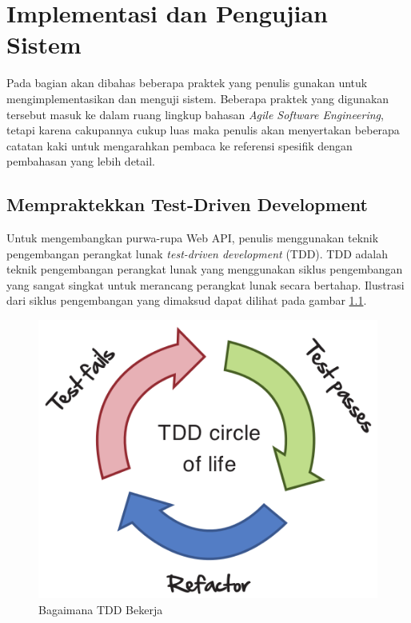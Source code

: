 \documentclass[a4paper, 12pt, oneside]{report}
\begin{document}
\chapter{Implementasi dan Pengujian Sistem}

\onehalfspacing Pada bagian akan dibahas beberapa praktek yang penulis gunakan untuk mengimplementasikan dan menguji sistem. Beberapa praktek yang digunakan tersebut masuk ke dalam ruang lingkup bahasan \textit{Agile Software Engineering}, tetapi karena cakupannya cukup luas maka penulis akan menyertakan beberapa catatan kaki untuk mengarahkan pembaca ke referensi spesifik dengan pembahasan yang lebih detail.

\section{Mempraktekkan Test-Driven Development}

\onehalfspacing Untuk mengembangkan purwa-rupa Web API, penulis menggunakan teknik pengembangan perangkat lunak \textit{test-driven development} (TDD). TDD adalah teknik pengembangan perangkat lunak yang menggunakan siklus pengembangan yang sangat singkat untuk merancang perangkat lunak secara bertahap. Ilustrasi dari siklus pengembangan yang dimaksud dapat dilihat pada gambar \ref{tdd-cycle}.

\begin{figure}[htp]
\centering
\includegraphics[scale=0.46]{images/tdd-cycle.png}
\caption{Bagaimana TDD Bekerja \cite{agile-samurai}}
\label{tdd-cycle}
\end{figure}
\end{document}
